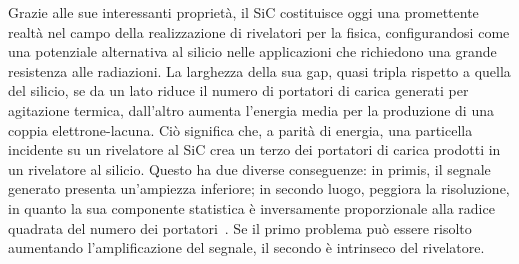 Grazie alle sue interessanti proprietà, il SiC costituisce oggi una promettente realtà nel campo della realizzazione di rivelatori per la fisica, configurandosi come una potenziale alternativa al silicio nelle applicazioni che richiedono una grande resistenza alle radiazioni.
%
La larghezza della sua gap, quasi tripla rispetto a quella del silicio, se da un lato riduce il numero di portatori di carica generati per agitazione termica, dall'altro aumenta l'energia media per la produzione di una coppia elettrone-lacuna. 
%
Ciò significa che, a parità di energia, una particella incidente su un rivelatore al SiC crea un terzo dei portatori di carica prodotti in un rivelatore al silicio.
Questo ha due diverse conseguenze: in primis, il segnale generato presenta un'ampiezza inferiore; in secondo luogo, peggiora la risoluzione, in quanto la sua componente statistica è inversamente proporzionale alla radice quadrata del numero dei portatori~\cite{knoll:10}.
Se il primo problema può essere risolto aumentando l'amplificazione del segnale, il secondo è intrinseco del rivelatore.
%
%
%
%

